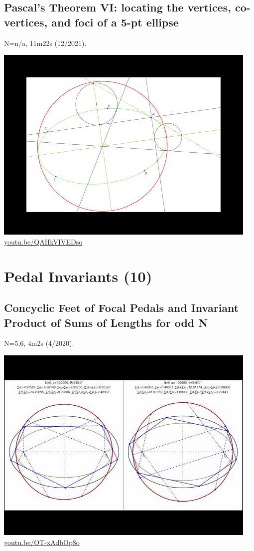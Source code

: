 \documentclass[12pt]{amsart}
\begin{document}
\subsection{Pascal's Theorem VI: locating the vertices, co-vertices, and foci of a 5-pt ellipse}
\label{vid:QAHkVIVEDso}
\noindent N=n/a, 11m22s (12/2021). 
\begin{center}\includegraphics[width=.5\textwidth]{pics/QAHkVIVEDso.jpg} \\ 
\href{https://youtu.be/QAHkVIVEDso}{\url{youtu.be/QAHkVIVEDso}}\end{center}
% 

\section{Pedal Invariants (10)}

\subsection{Concyclic Feet of Focal Pedals and Invariant Product of Sums of Lengths for odd N}
\label{vid:OT-xAdbOp8o}
\noindent N=5,6, 4m2s (4/2020). 
\begin{center}\includegraphics[width=.5\textwidth]{pics/OT-xAdbOp8o.jpg} \\ 
\href{https://youtu.be/OT-xAdbOp8o}{\url{youtu.be/OT-xAdbOp8o}}\end{center}
% 
\end{document}
